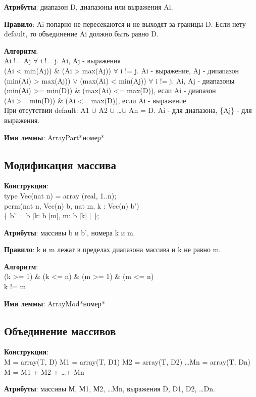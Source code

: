 \documentclass[12pt,a4paper]{article}
\begin{document}
\textbf{Атрибуты}: диапазон D, диапазоны или выражения Ai.

\textbf{Правило}: Ai попарно не пересекаются и не выходят за границы D. Если нету default, то объединение Ai должно быть равно D.

\textbf{Алгоритм}: \\
Ai != Aj $\forall$ i != j. Ai, Aj - выражения\\
(Ai < min(Aj)) \& (Ai > max(Aj)) $\forall$ i != j. Ai - выражение, Aj - дипапазон\\
(min(Ai) > max(Aj)) $\vee$ (max(Ai) < min(Aj)) $\forall$ i != j. Ai, Aj - диапазоны\\
(min(Аi) >= min(D)) \& (max(Ai) <= max(D)), если Ai - диапазон\\
(Ai >= min(D)) \& (Ai <= max(D)), если Ai - выражение \\
При отсутствии default: A1 $\cup$ A2 $\cup$ \dots $\cup$ An = D. Ai - для диапазона, \{Aj\} - для выражения.

\textbf{Имя леммы}: ArrayPart*номер*


\subsection{Модификация массива}
\textbf{Конструкция}: \\
type Vec(nat n) = array (real, 1..n); \\
perm(nat n, Vec(n) b, nat m, k : Vec(n) b') \\
\{ b' = b [k: b [m], m: b [k] ] \};

\textbf{Атрибуты}: массивы b и b', номера k и m.

\textbf{Правило}: k и m лежат в пределах диапазона массива и k не равно m.

\textbf{Алгоритм}: \\
(k >= 1) \& (k <= n) \& (m >= 1) \& (m <= n) \\
k != m

\textbf{Имя леммы}: ArrayMod*номер*


\subsection{Объединение массивов}
\textbf{Конструкция}: \\
M = array(T, D)  M1 = array(T, D1) M2 = array(T, D2) \dots Mn = array(T, Dn) \\
M = M1 + M2 + \dots + Mn

\textbf{Атрибуты}: массивы М, М1, М2, \dots Mn, выражения D, D1, D2, \dots Dn.
\end{document}
